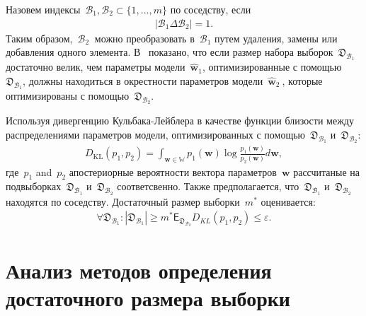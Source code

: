 Назовем индексы~$\mathcal{B}_1,\mathcal{B}_2 \subset \{1,...,m\}$ по соседству, если
\[
\label{eq:bs:8}
\begin{aligned}
	\left|\mathcal{B}_1 \Delta \mathcal{B}_2\right| = 1.
\end{aligned}
\]
Таким образом,~$\mathcal{B}_2~$ можно преобразовать в~$\mathcal{B}_1$ путем удаления, замены или добавления одного элемента. В~\cite{motrenko2014} показано, что если размер набора выборок~$\mathfrak {D}_{\mathcal {B}_1}$ достаточно велик, чем параметры модели~$\hat{\textbf {w}}_1$, оптимизированные с помощью~$\mathfrak{D}_{\mathcal{B}_1}$, должны находиться в окрестности параметров модели~$\hat{\textbf{w}}_2~$, которые оптимизированы с помощью~$\mathfrak{D}_{\mathcal {B}_2}$.
	 
Используя дивергенцию Кульбака-Лейблера в качестве функции близости между распределениями параметров модели, оптимизированных с помощью~$\mathfrak{D}_{\mathcal{B}_1}$ и~$\mathfrak{D}_{\mathcal{B}_2}$:
\[
\label{eq:bs:9}
\begin{aligned}
	D_\text{KL}\left(p_1, p_2\right) = \int_{\textbf{w}\in\mathbb{W}}p_1(\textbf{w})\log\frac{p_1(\textbf{w})}{p_2(\textbf{w})}d\textbf{w},
\end{aligned}
\]
где~$p_1$ and~$p_2$ апостериорные вероятности вектора параметров~$\textbf{w}$ рассчитаные на подвыборках~$\mathfrak{D}_{\mathcal{B}_1}$ и~$\mathfrak{D}_{\mathcal{B}_2}$ соответсвенно. Также предполагается, что~$\mathfrak{D}_{\mathcal{B}_1}$ и~$\mathfrak{D}_{\mathcal{B}_2}$ находятся по соседству.
Достаточный размер выборки~$m^*$ оценивается:
\[
\label{eq:bs:10}
\begin{aligned}
	\forall \mathfrak{D}_{\mathcal{B}_1}: \left|\mathfrak{D}_{\mathcal{B}_1}\right| \geq m^*    \mathsf{E}_{\mathfrak{D}_{\mathcal{B}_2}}D_{KL}\left(p_1, p_2\right) \leq \varepsilon.
\end{aligned}
\]

	  
\section{Анализ методов определения достаточного размера выборки}
\begin{table}[!htp]
\centering
\caption{Описание выборок для анализа качества определения оптимального размера выборки}
\label{table20}
\end{table} 


